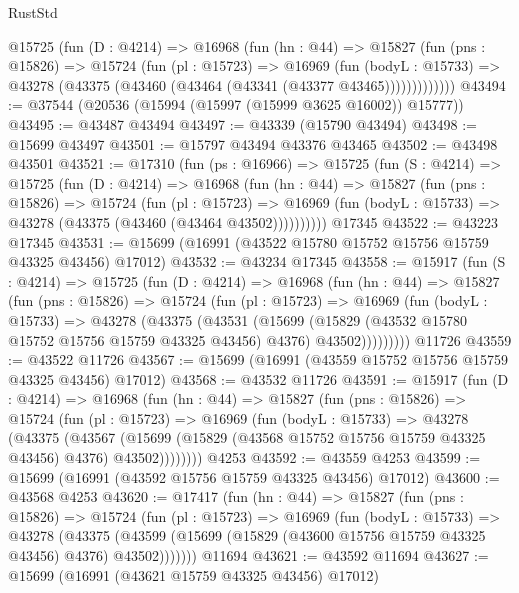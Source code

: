 \begin{lexlean}{RustStd}
\begin{coremodule}
        @15725
          (fun (D : @4214) =>
          @16968
            (fun (hn : @44) =>
            @15827
              (fun (pns : @15826) =>
              @15724
                (fun (pl : @15723) =>
                @16969
                  (fun (bodyL : @15733) =>
                  @43278 (@43375 (@43460 (@43464 (@43341 (@43377 @43465)))))))))))))
@43494 := @37544 (@20536 (@15994 (@15997 (@15999 @3625 @16002)) @15777))
@43495 := @43487 @43494
@43497 := @43339 (@15790 @43494)
@43498 := @15699 @43497
@43501 := @15797 @43494 @43376 @43465
@43502 := @43498 @43501
@43521 := @17310
    (fun (ps : @16966) =>
    @15725
      (fun (S : @4214) =>
      @15725
        (fun (D : @4214) =>
        @16968
          (fun (hn : @44) =>
          @15827
            (fun (pns : @15826) =>
            @15724
              (fun (pl : @15723) =>
              @16969 (fun (bodyL : @15733) => @43278 (@43375 (@43460 (@43464 @43502))))))))))
    @17345
@43522 := @43223 @17345
@43531 := @15699 (@16991 (@43522 @15780 @15752 @15756 @15759 @43325 @43456) @17012)
@43532 := @43234 @17345
@43558 := @15917
    (fun (S : @4214) =>
    @15725
      (fun (D : @4214) =>
      @16968
        (fun (hn : @44) =>
        @15827
          (fun (pns : @15826) =>
          @15724
            (fun (pl : @15723) =>
            @16969
              (fun (bodyL : @15733) =>
              @43278
                (@43375
                  (@43531
                    (@15699
                      (@15829 (@43532 @15780 @15752 @15756 @15759 @43325 @43456) @4376)
                      @43502)))))))))
    @11726
@43559 := @43522 @11726
@43567 := @15699 (@16991 (@43559 @15752 @15756 @15759 @43325 @43456) @17012)
@43568 := @43532 @11726
@43591 := @15917
    (fun (D : @4214) =>
    @16968
      (fun (hn : @44) =>
      @15827
        (fun (pns : @15826) =>
        @15724
          (fun (pl : @15723) =>
          @16969
            (fun (bodyL : @15733) =>
            @43278
              (@43375
                (@43567
                  (@15699 (@15829 (@43568 @15752 @15756 @15759 @43325 @43456) @4376) @43502))))))))
    @4253
@43592 := @43559 @4253
@43599 := @15699 (@16991 (@43592 @15756 @15759 @43325 @43456) @17012)
@43600 := @43568 @4253
@43620 := @17417
    (fun (hn : @44) =>
    @15827
      (fun (pns : @15826) =>
      @15724
        (fun (pl : @15723) =>
        @16969
          (fun (bodyL : @15733) =>
          @43278
            (@43375
              (@43599 (@15699 (@15829 (@43600 @15756 @15759 @43325 @43456) @4376) @43502)))))))
    @11694
@43621 := @43592 @11694
@43627 := @15699 (@16991 (@43621 @15759 @43325 @43456) @17012)

\end{coremodule}
\end{lexlean}
